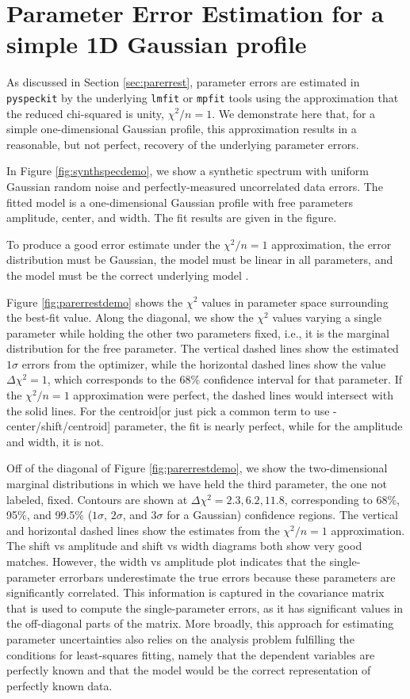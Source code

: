 \documentclass[twocolumn]{aastex62}
\newcommand{\pyspeckit}{\texttt{pyspeckit}\xspace}
\begin{document}



\appendix
\section{Parameter Error Estimation for a simple 1D Gaussian profile}
\label{appendix:parerrest}
As discussed in Section \ref{sec:parerrest}, parameter errors are estimated in
\pyspeckit by the underlying \texttt{lmfit} or \texttt{mpfit} tools using the
approximation that the reduced chi-squared is unity, $\chi^2/n=1$.  We
demonstrate here that, for a simple one-dimensional Gaussian profile, this
approximation results in a reasonable, but not perfect, recovery of the
underlying parameter errors.

In Figure \ref{fig:synthspecdemo}, we show a synthetic spectrum with uniform
Gaussian random noise and perfectly-measured uncorrelated data errors.
The fitted model is a one-dimensional Gaussian profile with free parameters
amplitude, center, and width.  The fit results are given in the figure.

To produce a good error estimate under the $\chi^2/n=1$ approximation, the error
distribution must be Gaussian, the model must be
linear in all parameters, and the model must be the correct underlying model
\citep{Andrae2010b}.

Figure \ref{fig:parerrestdemo} shows the $\chi^2$ values in parameter space
surrounding the best-fit value.  Along the diagonal, we show the $\chi^2$
values varying a single parameter while holding the other two parameters fixed,
i.e., it is the marginal distribution for the free parameter.  The vertical
dashed lines show the estimated $1\sigma$ errors from the optimizer, while the
horizontal dashed lines show the value $\Delta\chi^2=1$, which corresponds to
the 68\% confidence interval for that parameter.  If the $\chi^2/n=1$
approximation were perfect, the dashed lines would intersect with the solid
lines.  For the centroid[or just pick a common term to use - center/shift/centroid]
parameter, the fit is nearly perfect, while for the
amplitude and width, it is not.

Off of the diagonal of Figure \ref{fig:parerrestdemo}, we show the
two-dimensional marginal distributions in which we have held the third
parameter, the one not labeled, fixed.  Contours are shown at
$\Delta\chi^2=2.3,6.2,11.8$, corresponding to 68\%, 95\%, and 99.5\%
($1\sigma$, $2\sigma$, and $3\sigma$ for a Gaussian) confidence regions.  The
vertical and horizontal dashed lines show the estimates from the $\chi^2/n=1$
approximation.
The shift vs amplitude and shift vs width diagrams both show very good matches.
However, the width vs amplitude plot indicates that the single-parameter
errorbars underestimate the true errors because these parameters are
significantly correlated.  This information is captured in the covariance
matrix that is used to compute the single-parameter errors, as it has
significant values in the off-diagonal parts of the matrix.  More broadly, this
approach for estimating parameter uncertainties also relies on the analysis
problem fulfilling the conditions for least-squares fitting, namely that the
dependent variables are perfectly known and that the model would be the correct
representation of perfectly known data.
\end{document}
